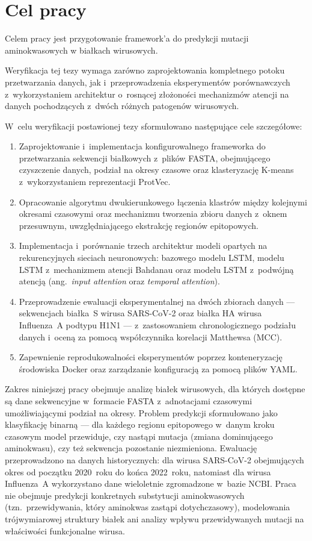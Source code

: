 \newpage
\section{Cel pracy}

Celem pracy jest przygotowanie framework'a do predykcji mutacji aminokwasowych w białkach wirusowych.


Weryfikacja tej tezy wymaga zarówno zaprojektowania kompletnego potoku przetwarzania danych, jak i~przeprowadzenia eksperymentów porównawczych z~wykorzystaniem architektur o~rosnącej złożoności mechanizmów atencji na danych pochodzących z~dwóch różnych patogenów wirusowych.

W~celu weryfikacji postawionej tezy sformułowano następujące cele szczegółowe:
\begin{enumerate}
    \item Zaprojektowanie i~implementacja konfigurowalnego frameworka do przetwarzania sekwencji białkowych z~plików FASTA, obejmującego czyszczenie danych, podział na okresy czasowe oraz klasteryzację K-means z~wykorzystaniem reprezentacji ProtVec.
    \item Opracowanie algorytmu dwukierunkowego łączenia klastrów między kolejnymi okresami czasowymi oraz mechanizmu tworzenia zbioru danych z~oknem przesuwnym, uwzględniającego ekstrakcję regionów epitopowych.
    \item Implementacja i~porównanie trzech architektur modeli opartych na rekurencyjnych sieciach neuronowych: bazowego modelu LSTM, modelu LSTM z~mechanizmem atencji Bahdanau oraz modelu LSTM z~podwójną atencją (ang.~\textit{input attention} oraz \textit{temporal attention}).
    \item Przeprowadzenie ewaluacji eksperymentalnej na dwóch zbiorach danych --- sekwencjach białka~S wirusa SARS-CoV-2 oraz białka HA wirusa Influenza~A podtypu H1N1 --- z~zastosowaniem chronologicznego podziału danych i~oceną za pomocą współczynnika korelacji Matthewsa (MCC).
    \item Zapewnienie reprodukowalności eksperymentów poprzez konteneryzację środowiska Docker oraz zarządzanie konfiguracją za pomocą plików YAML.
\end{enumerate}

Zakres niniejszej pracy obejmuje analizę białek wirusowych, dla których dostępne są dane sekwencyjne w~formacie FASTA z~adnotacjami czasowymi umożliwiającymi podział na okresy. Problem predykcji sformułowano jako klasyfikację binarną --- dla każdego regionu epitopowego w~danym kroku czasowym model przewiduje, czy nastąpi mutacja (zmiana dominującego aminokwasu), czy też sekwencja pozostanie niezmieniona. Ewaluację przeprowadzono na danych historycznych: dla wirusa SARS-CoV-2 obejmujących okres od początku 2020~roku do końca 2022~roku, natomiast dla wirusa Influenza~A wykorzystano dane wieloletnie zgromadzone w~bazie NCBI. Praca nie obejmuje predykcji konkretnych substytucji aminokwasowych (tzn.~przewidywania, który aminokwas zastąpi dotychczasowy), modelowania trójwymiarowej struktury białek ani analizy wpływu przewidywanych mutacji na właściwości funkcjonalne wirusa.
